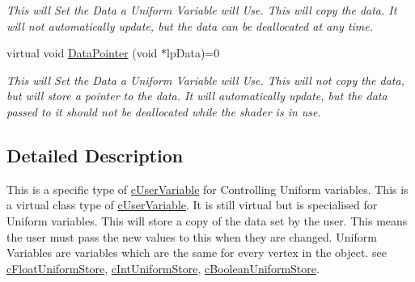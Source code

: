\begin{DoxyCompactItemize}
\begin{DoxyCompactList}\small\item\em This will Set the Data a Uniform Variable will Use. This will copy the data. It will not automatically update, but the data can be deallocated at any time. \end{DoxyCompactList}\item 
\hypertarget{classc_uniform_store_a00ceec8165d75bd5e55c69e96375e523}{
virtual void \hyperlink{classc_uniform_store_a00ceec8165d75bd5e55c69e96375e523}{DataPointer} (void $\ast$lpData)=0}
\label{classc_uniform_store_a00ceec8165d75bd5e55c69e96375e523}

\begin{DoxyCompactList}\small\item\em This will Set the Data a Uniform Variable will Use. This will not copy the data, but will store a pointer to the data. It will automatically update, but the data passed to it should not be deallocated while the shader is in use. \end{DoxyCompactList}\end{DoxyCompactItemize}


\subsection{Detailed Description}
This is a specific type of \hyperlink{classc_user_variable}{cUserVariable} for Controlling Uniform variables. This is a virtual class type of \hyperlink{classc_user_variable}{cUserVariable}. It is still virtual but is specialised for Uniform variables. This will store a copy of the data set by the user. This means the user must pass the new values to this when they are changed. Uniform Variables are variables which are the same for every vertex in the object. see \hyperlink{classc_float_uniform_store}{cFloatUniformStore}, \hyperlink{classc_int_uniform_store}{cIntUniformStore}, \hyperlink{classc_boolean_uniform_store}{cBooleanUniformStore}. 